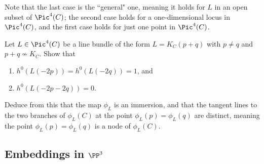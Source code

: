 Note that the last case is the ``general" one, meaning it holds for $L$ in an open subset of $\Pic^4(C)$; the second case holds for a one-dimensional locus in $\Pic^4(C)$, and the first case holds for just one point in $\Pic^4(C)$.

\begin{exercise}\label{nodal quartic}
Let $L \in \Pic^4(C)$ be a line bundle of the form $L = K_C(p+q)$ with $p \neq q$ and $p+q \not\sim K_C$. Show that
\begin{enumerate}
\item $h^0(L(-2p)) = h^0(L(-2q)) = 1$, and
\item $h^0(L(-2p-2q)) = 0$.
\end{enumerate}
Deduce from this that the map $\phi_L$ is an immersion, and that the tangent lines to the two branches of $\phi_L(C)$ at the point $\phi_L(p) = \phi_L(q)$ are distinct, meaning the point $\phi_L(p) = \phi_L(q)$ is a node of $\phi_L(C)$.
\end{exercise}

%
%

\subsection{Embeddings in $\PP^3$}


